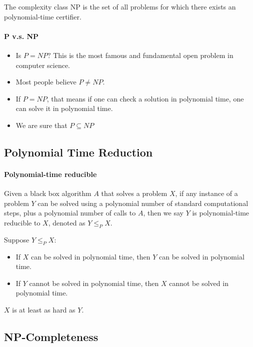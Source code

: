                 \begin{definition}[class NP]
                    The complexity class NP is the set of all problems for which there exists an polynomial-time certifier.
                \end{definition}

            \paragraph{P v.s. NP}
                \begin{itemize}
                    \item Is $P = NP?$ This is the most famous and fundamental open problem in computer science.
                    \item Most people believe $P \neq NP$.
                    \item If $P = NP$, that means if one can check a solution in polynomial time, one can solve it in polynomial time.
                    \item We are sure that $P \subseteq NP$
                \end{itemize}

        \subsection{Polynomial Time Reduction}
            \paragraph{Polynomial-time reducible} Given a black box algorithm $A$ that solves a problem $X$, if any instance of a problem $Y$ can be solved using a polynomial number of standard computational steps, plus a polynomial number of calls to $A$, then we say $Y$ is polynomial-time reducible to $X$, denoted as $Y \le_P X$.

            Suppose $Y \le_P X$:
            \begin{itemize}
                \item If $X$ can be solved in polynomial time, then $Y$ can be solved in polynomial time.
                \item If $Y$ cannot be solved in polynomial time, then $X$ cannot be solved in polynomial time.
            \end{itemize}

            $X$ is at least as hard as $Y$.

        \subsection{NP-Completeness}
